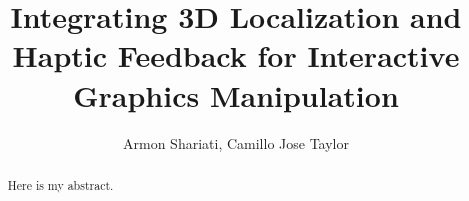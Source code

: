 \documentclass{IEEEtran}
\title{Integrating 3D Localization and Haptic Feedback for Interactive Graphics Manipulation}
\author{Armon Shariati, Camillo Jose Taylor}
\begin{document}
\setlength{\pdfpagewidth}{8.5in}
\setlength{\pdfpageheight}{11 in}
\maketitle

\begin{abstract}
Here is my abstract.
\end{abstract}





\end{document}
